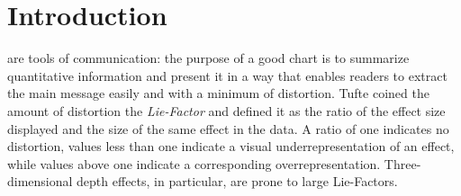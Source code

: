 \section{Introduction}
%
%



% 
% 
% 
% 
 are tools of communication: the purpose of a good chart is  to summarize quantitative information and present it in a way that enables readers  to extract the main message easily and with a minimum of distortion. Tufte  coined the amount of distortion the \emph{Lie-Factor} \citep[p. 57--69]{tufte} and defined it as the ratio of the effect size displayed and the size of the same effect in the data. A ratio of one indicates no distortion, values less than one indicate a visual underrepresentation of an effect, while values above one indicate a corresponding overrepresentation. Three-dimensional depth effects, in particular, are prone to large Lie-Factors.

